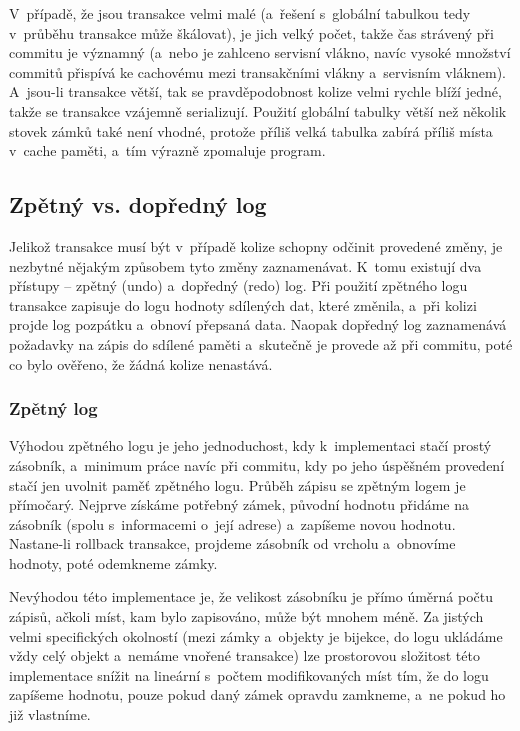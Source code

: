 V~případě, že jsou transakce velmi malé (a~řešení
s~globální tabulkou tedy v~průběhu transakce může škálovat), je jich velký počet,
takže čas strávený při commitu je významný (a~nebo je zahlceno servisní vlákno,
navíc vysoké množství commitů přispívá ke cachovému  mezi transakčními
vlákny a~servisním vláknem). A~jsou-li transakce větší, tak se pravděpodobnost kolize
velmi rychle blíží jedné, takže se transakce vzájemně serializují. Použití
globální tabulky větší než několik stovek zámků také není vhodné, protože
příliš velká tabulka zabírá příliš místa v~cache paměti, a~tím výrazně zpomaluje program.


\subsection{Zpětný vs. dopředný log}

Jelikož transakce musí být v~případě kolize schopny odčinit provedené změny,
je nezbytné nějakým způsobem tyto změny zaznamenávat. K~tomu existují dva přístupy
-- zpětný (undo)  a~dopředný (redo) log.
Při použití zpětného logu transakce zapisuje
do logu hodnoty sdílených dat, které změnila, a~při kolizi projde log
pozpátku a~obnoví přepsaná data. Naopak dopředný log zaznamenává požadavky na
zápis do sdílené paměti a~skutečně je provede až při commitu, poté co bylo
ověřeno, že žádná kolize nenastává.

\subsubsection*{Zpětný log}
Výhodou zpětného logu je jeho jednoduchost, kdy k~implementaci stačí prostý
zásobník, a~minimum práce navíc při commitu, kdy po jeho úspěšném provedení
stačí jen uvolnit paměť zpětného logu. Průběh zápisu se zpětným  logem je
přímočarý.
Nejprve získáme potřebný zámek, původní hodnotu přidáme na zásobník
(spolu s~informacemi o~její adrese) a~zapíšeme novou hodnotu. Nastane-li
rollback transakce, projdeme zásobník od vrcholu a~obnovíme hodnoty, poté
odemkneme zámky.

Nevýhodou této implementace je, že velikost zásobníku je přímo úměrná počtu zápisů,
ačkoli míst, kam bylo zapisováno, může být mnohem méně. Za jistých velmi specifických
okolností (mezi zámky a~objekty je bijekce, do logu ukládáme vždy celý objekt
a~nemáme vnořené transakce) lze prostorovou složitost této implementace snížit
na lineární s~počtem modifikovaných míst tím, že do logu zapíšeme hodnotu,
pouze pokud daný zámek opravdu zamkneme, a~ne pokud ho již vlastníme.


